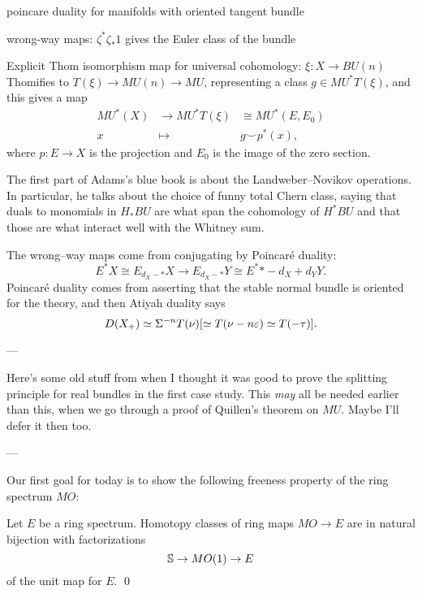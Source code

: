 poincare duality for manifolds with oriented tangent bundle

wrong-way maps: $\zeta^* \zeta_* 1$ gives the Euler class of the bundle

Explicit Thom isomorphism map for universal cohomology: $\xi: X \to BU(n)$ Thomifies to $T(\xi) \to MU(n) \to MU$, representing a class $g \in MU^* T(\xi)$, and this gives a map
\begin{align*}
MU^*(X) & \to MU^* T(\xi) & \cong MU^*(E, E_0)\\
x & \mapsto & g \smile p^*(x),
\end{align*}
where $p: E \to X$ is the projection and $E_0$ is the image of the zero section.

The first part of Adams's blue book is about the Landweber--Novikov operations.  In particular, he talks about the choice of funny total Chern class, saying that duals to monomials in $H_* BU$ are what span the cohomology of $H^* BU$ and that those are what interact well with the Whitney sum.

The wrong--way maps come from conjugating by Poincar\'e duality: \[E^* X \cong E_{d_X-*} X \to E_{d_X-*} Y \cong E^*{*-d_X+d_Y} Y.\]  Poincar\'e duality comes from asserting that the stable normal bundle is oriented for the theory, and then Atiyah duality says \[D(X_+) \simeq \Susp^{-n} T(\nu) [\simeq T(\nu - n\eps) \simeq T(-\tau)]. \]

---

Here's some old stuff from when I thought it was good to prove the splitting principle for real bundles in the first case study.  This \emph{may} all be needed earlier than this, when we go through a proof of Quillen's theorem on $MU$.  Maybe I'll defer it then too.

---

Our first goal for today is to show the following freeness property of the ring spectrum $MO$:
\begin{theorem}
Let $E$ be a ring spectrum.  Homotopy classes of ring maps $MO \to E$ are in natural bijection with factorizations \[\S \to MO(1) \to E\] of the unit map for $E$. \qed
\end{theorem}

